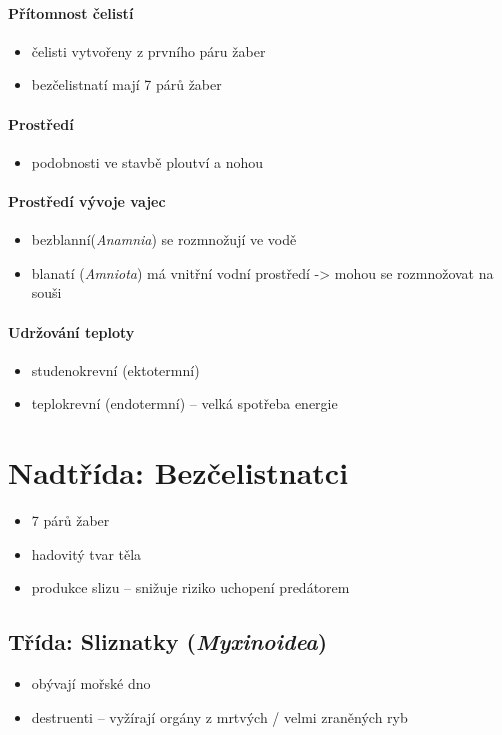 \paragraph{Přítomnost čelistí}
\begin{itemize}
\item čelisti vytvořeny z prvního páru žaber
\item bezčelistnatí mají 7 párů žaber
\end{itemize}

\paragraph{Prostředí}
\begin{itemize}
\item podobnosti ve stavbě ploutví a nohou
\end{itemize}

\paragraph{Prostředí vývoje vajec}
\begin{itemize}
\item bezblanní(\textit{Anamnia}) se rozmnožují ve vodě
\item blanatí (\textit{Amniota}) má vnitřní vodní prostředí -> mohou se rozmnožovat na souši
\end{itemize}

\paragraph{Udržování teploty}
\begin{itemize}
\item studenokrevní (ektotermní)
\item teplokrevní (endotermní) -- velká spotřeba energie
\end{itemize}

\newpage
\section{Nadtřída: Bezčelistnatci}
\begin{itemize}
\item 7 párů žaber
\item hadovitý tvar těla
\item produkce slizu -- snižuje riziko uchopení predátorem
\end{itemize}

\subsection{Třída: Sliznatky (\textit{Myxinoidea})}
\begin{itemize}
\item obývají mořské dno
\item destruenti -- vyžírají orgány z mrtvých / velmi zraněných ryb
\end{itemize}


